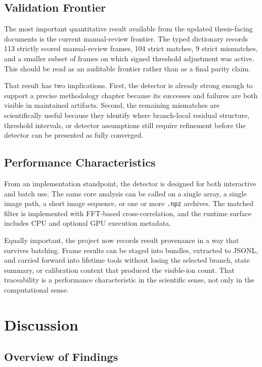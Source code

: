 \documentclass[12pt]{report}
\begin{document}
\section{Validation Frontier}

The most important quantitative result available from the updated thesis-facing documents is the current manual-review frontier. The typed dictionary records 113 strictly scored manual-review frames, 104 strict matches, 9 strict mismatches, and a smaller subset of frames on which signed threshold adjustment was active. This should be read as an auditable frontier rather than as a final parity claim.

That result has two implications. First, the detector is already strong enough to support a precise methodology chapter because its successes and failures are both visible in maintained artifacts. Second, the remaining mismatches are scientifically useful because they identify where branch-local residual structure, threshold intervals, or detector assumptions still require refinement before the detector can be presented as fully converged.

\section{Performance Characteristics}

From an implementation standpoint, the detector is designed for both interactive and batch use. The same core analysis can be called on a single array, a single image path, a short image sequence, or one or more \texttt{.npz} archives. The matched filter is implemented with FFT-based cross-correlation, and the runtime surface includes CPU and optional GPU execution metadata.

Equally important, the project now records result provenance in a way that survives batching. Frame results can be staged into bundles, extracted to JSONL, and carried forward into lifetime tools without losing the selected branch, state summary, or calibration context that produced the visible-ion count. That traceability is a performance characteristic in the scientific sense, not only in the computational sense.

\chapter{Discussion}

\section{Overview of Findings}
\end{document}
